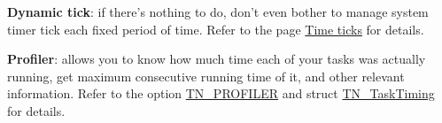 \begin{DoxyItemize}
\item {\bfseries Dynamic tick}\+: if there's nothing to do, don't even bother to manage system timer tick each fixed period of time. Refer to the page \hyperlink{time_ticks}{Time ticks} for details.
\item {\bfseries Profiler}\+: allows you to know how much time each of your tasks was actually running, get maximum consecutive running time of it, and other relevant information. Refer to the option {\ttfamily \hyperlink{tn__cfg__default_8h_a49a546b18cc1f75b51d4cf8b290634dd}{T\+N\+\_\+\+P\+R\+O\+F\+I\+L\+E\+R}} and {\ttfamily struct \hyperlink{structTN__TaskTiming}{T\+N\+\_\+\+Task\+Timing}} for details. 
\end{DoxyItemize}